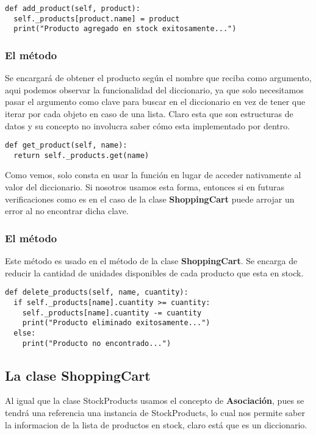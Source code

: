 \begin{verbatim}
def add_product(self, product):
  self._products[product.name] = product
  print("Producto agregado en stock exitosamente...")
\end{verbatim}

\subsubsection{El método }
Se encargará de obtener el producto según el nombre que reciba como argumento, aqui podemos observar la funcionalidad del diccionario, ya que solo necesitamos pasar el argumento como clave para buscar en el diccionario en vez de tener que iterar por cada objeto en caso de una lista. Claro esta que son estructuras de datos y su concepto no involucra saber cómo esta implementado por dentro.

\begin{verbatim}
def get_product(self, name):
  return self._products.get(name)
\end{verbatim}

Como vemos, solo consta en usar la función  en lugar de acceder nativamente al valor del diccionario. Si nosotros usamos esta forma, entonces si en futuras verificaciones como es en el caso de la clase \textbf{ShoppingCart} puede arrojar un error al no encontrar dicha clave.

\subsubsection{El método }
Este método es usado en el método  de la clase \textbf{ShoppingCart}. Se encarga de reducir la cantidad de unidades disponibles de cada producto que esta en stock.

\begin{verbatim}
def delete_products(self, name, cuantity):
  if self._products[name].cuantity >= cuantity:
    self._products[name].cuantity -= cuantity 
    print("Producto eliminado exitosamente...")
  else:
    print("Producto no encontrado...")
\end{verbatim}

\subsection{La clase ShoppingCart}
Al igual que la clase StockProducts usamos el concepto de \textbf{Asociación}, pues se tendrá una referencia una instancia de StockProducts, lo cual nos permite saber la informacion de la lista de productos en stock, claro está que es un diccionario.

